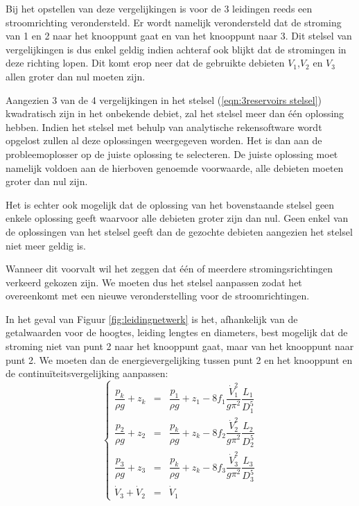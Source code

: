 Bij het opstellen van deze vergelijkingen is voor de 3 leidingen reeds een stroomrichting verondersteld. Er wordt namelijk verondersteld dat de stroming van 1 en 2 naar het knooppunt gaat en van het knooppunt naar 3. Dit stelsel van vergelijkingen is dus enkel geldig indien achteraf ook blijkt dat de stromingen in deze richting lopen. Dit komt erop neer dat de gebruikte debieten $V_1$,$V_2$ en $V_3$ allen groter dan nul moeten zijn.

Aangezien 3 van de 4 vergelijkingen in het stelsel (\ref{eqn:3reservoirs stelsel}) kwadratisch zijn in het onbekende debiet, zal het stelsel meer dan één oplossing hebben. Indien het stelsel met behulp van analytische rekensoftware wordt opgelost zullen al deze oplossingen weergegeven worden. Het is dan aan de probleemoplosser op de juiste oplossing te selecteren. De juiste oplossing moet namelijk voldoen aan de hierboven genoemde voorwaarde, alle debieten moeten groter dan nul zijn.

Het is echter ook mogelijk dat de oplossing van het bovenstaande stelsel geen enkele oplossing geeft waarvoor alle debieten groter zijn dan nul. Geen enkel van de oplossingen van het stelsel geeft dan de gezochte debieten aangezien het stelsel niet meer geldig is.

Wanneer dit voorvalt wil het zeggen dat één of meerdere stromingsrichtingen verkeerd gekozen zijn. We moeten dus het stelsel aanpassen zodat het overeenkomt met een nieuwe veronderstelling voor de stroomrichtingen.

In het geval van Figuur \ref{fig:leidingnetwerk} is het, afhankelijk van de getalwaarden voor de hoogtes, leiding lengtes en diameters, best mogelijk dat de stroming niet van punt 2 naar het knooppunt gaat, maar van het knooppunt naar punt 2. We moeten dan de energievergelijking tussen punt 2 en het knooppunt en de continuïteitsvergelijking aanpassen:
			\begin{equation}
				\left\{
				\begin{array}{lcl}
					\dfrac{p_k}{\rho g} + z_k &=& \dfrac{p_1}{\rho g} + z_1 - 8 f_1 \dfrac{\dot{V}_1^2}{g \pi^2} \dfrac{L_1}{D_1^5} \\
					\dfrac{p_2}{\rho g} + z_2 &=& \dfrac{p_k}{\rho g} + z_k - 8 f_2 \dfrac{\dot{V}_2^2}{g \pi^2} \dfrac{L_2}{D_2^5} \\
					\dfrac{p_3}{\rho g} + z_3 &=& \dfrac{p_k}{\rho g} + z_k - 8 f_3 \dfrac{\dot{V}_3^2}{g \pi^2} \dfrac{L_3}{D_3^5} \\
					\dot{V}_3 + \dot{V}_2 &=& \dot{V}_1 
				\end{array}
				\right.
				\label{eqn:3reservoirs stelsel2}
			\end{equation}

